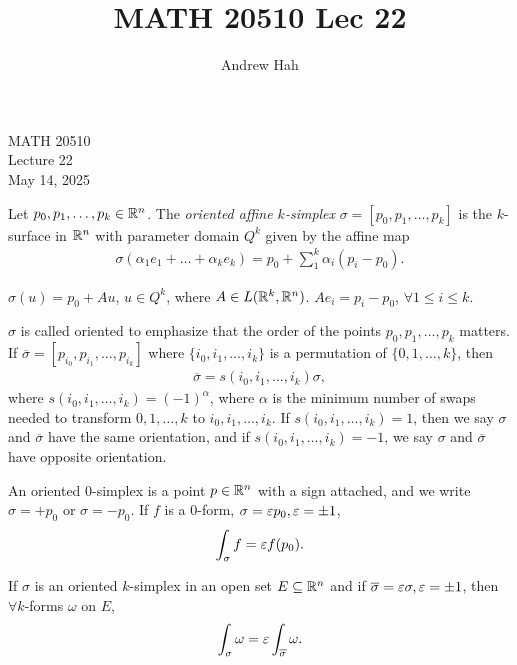 \documentclass[11pt]{article}
\title{MATH 20510 Lec 22}
\author{Andrew Hah}
\begin{document}
\pagestyle{plain}
\begin{center}
{\Large MATH 20510} \\
{\Large Lecture 22} \\
\vspace{.2in}
May 14, 2025
\end{center}

\begin{definition} Let $p_0, p_1, \dots, p_k \in \mathbb{R}^n$. The \emph{oriented affine $k$-simplex} $\sigma = [p_0, p_1, \dots, p_k]$ is the $k$-surface in $\mathbb{R}^n$ with parameter domain $Q^k$ given by the affine map \begin{align*} \sigma (\alpha_1e_1 + \dots + \alpha_k e_k) = p_0 + \sum_1^k \alpha_i (p_i - p_0).
\end{align*}
\end{definition}

\begin{remark} $\sigma(u) = p_0 + Au$, $u \in Q^k$, where $A \in L(\mathbb{R}^k, \mathbb{R}^n)$. $Ae_i = p_i - p_0$, $\forall 1 \le i \le k$.
\end{remark}

\begin{remark} $\sigma$ is called oriented to emphasize that the order of the points $p_0, p_1, \dots, p_k$ matters. If $\overline{\sigma} = [p_{i_0}, p_{i_1}, \dots, p_{i_k}]$ where $\{ i_0, i_1, \dots, i_k \}$ is a permutation of $\{ 0, 1, \dots, k \}$, then \begin{align*} \overline{\sigma} =  s(i_0, i_1, \dots, i_k) \sigma,
\end{align*} where $s(i_0, i_1, \dots, i_k) = (-1)^{\alpha}$, where $\alpha$ is the minimum number of swaps needed to transform $0, 1, \dots, k$ to $i_0, i_1, \dots, i_k$. If $s(i_0, i_1, \dots, i_k) = 1$, then we say $\sigma$ and $\overline{\sigma}$ have the same orientation, and if $s(i_0, i_1, \dots, i_k) = -1$, we say $\sigma$ and $\overline{\sigma}$ have opposite orientation.
\end{remark}

\begin{definition} An oriented $0$-simplex is a point $p \in \mathbb{R}^n$ with a sign attached, and we write $\sigma = +p_0$ or $\sigma = -p_0$. If $f$ is a $0$-form, $\sigma = \varepsilon p_0, \varepsilon = \pm 1$, \begin{align*} \int_{\sigma} f = \varepsilon f (p_0).
\end{align*}
\end{definition}

\begin{theorem} If $\sigma$ is an oriented $k$-simplex in an open set $E \subseteq \mathbb{R}^n$ and if $\overline{\sigma} = \varepsilon \sigma, \varepsilon = \pm 1$, then $\forall k$-forms $\omega$ on $E$, \begin{align*} \int_{\sigma} \omega = \varepsilon \int_{\overline{\sigma}} \omega.
\end{align*}
\end{theorem}
\end{document}
